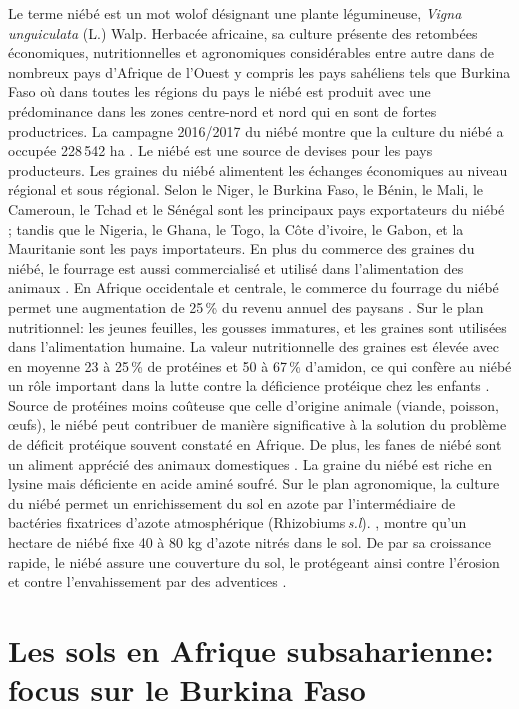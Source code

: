 \documentclass[a4paper,11pt]{article}
\begin{document}
Le terme niébé est un mot wolof désignant une plante légumineuse,
\emph{Vigna unguiculata} (L.) Walp. Herbacée africaine, sa culture
présente des retombées économiques, nutritionnelles et agronomiques
considérables entre autre dans de nombreux pays d'Afrique de l'Ouest y
compris les pays sahéliens tels que Burkina Faso où dans toutes les
régions du pays le niébé est produit avec une prédominance dans les
zones centre-nord et nord qui en sont de fortes productrices. La
campagne 2016/2017 du niébé montre que la culture  du niébé a occupée
228\,542 ha \cite{DGESS_2017}. Le
niébé est une source de devises pour les pays producteurs. Les graines
du niébé alimentent les échanges économiques au niveau régional et
sous régional. Selon  le Niger, le Burkina
Faso, le Bénin, le Mali, le Cameroun, le Tchad et le Sénégal sont les
principaux pays exportateurs du niébé ; tandis que le Nigeria, le
Ghana, le Togo, la Côte d'ivoire, le Gabon, et la Mauritanie sont les
pays importateurs. En plus du commerce des graines du niébé, le
fourrage est aussi commercialisé et utilisé dans l'alimentation des
animaux \cite{Langyintuo_2003}. En Afrique occidentale et centrale, le
commerce du fourrage du niébé permet une augmentation de 25\,\% du
revenu annuel des paysans \cite{Quin_1997}. Sur le plan nutritionnel:
les jeunes feuilles, les gousses immatures, et les graines sont
utilisées dans l'alimentation humaine. La valeur nutritionnelle des
graines est élevée avec en moyenne 23 à 25\,\% de protéines et 50 à
67\,\% d'amidon, ce qui confère au niébé un rôle important dans la
lutte contre la déficience protéique chez les enfants
\cite{Quin_1997}. Source de protéines moins coûteuse que celle
d'origine animale (viande, poisson, œufs), le niébé peut contribuer de
manière significative à la solution du problème de déficit protéique
souvent constaté en Afrique. De plus, les fanes de niébé sont un
aliment apprécié des animaux domestiques \cite{BAMBARA_2008}. La
graine du niébé est riche en lysine mais déficiente en acide aminé
soufré. Sur le plan agronomique, la culture du niébé permet un
enrichissement du sol en azote par l'intermédiaire de bactéries
fixatrices d'azote atmosphérique
(Rhizobiums\,\emph{s.l}). , montre qu'un hectare de niébé
fixe 40 à 80 kg d'azote nitrés dans le sol. De par sa croissance
rapide, le niébé assure une couverture du sol, le protégeant ainsi
contre l'érosion et contre l'envahissement par des adventices
\cite{Sawadogo_2009}.

\section{Les sols en Afrique subsaharienne: focus sur le Burkina Faso}
\end{document}
